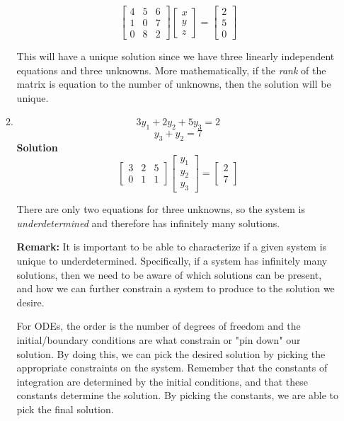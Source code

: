 \documentclass[letterpaper, fontsize=11pt]{scrartcl} %
\numberwithin{equation}{section} %
\numberwithin{figure}{section} %
\numberwithin{table}{section} %
\begin{document}
\begin{enumerate}
\begin{enumerate}
$$\left[ \begin{array}{ccc}
4 & 5 & 6 \\
1 & 0 & 7 \\
0 & 8 & 2 \end{array} \right]
\left[\begin{array}{c}
x  \\
y  \\
z  \end{array} \right] =
\left[\begin{array}{c}
2  \\
5  \\
0  \end{array} \right]$$

\par This will have a unique solution since we have three linearly independent equations and three unknowns. More mathematically, if the \textit{rank} of the matrix is equation to the number of unknowns, then the solution will be unique.

\item
$$ 3 y_1 + 2 y_2 + 5y_3 = 2$$
$$ y_3 + y_2 = 7$$
\textbf{Solution} \newline
$$\left[ \begin{array}{ccc}
3 & 2 & 5 \\
0 & 1 & 1 \end{array} \right]
\left[\begin{array}{c}
y_1  \\
y_2 \\
y_3  \end{array} \right] =
\left[\begin{array}{c}
2  \\
7  \end{array} \right]$$

\par There are only two equations for three unknowns, so the system is \textit{underdetermined} and therefore has infinitely many solutions. \newline

\par \textbf{Remark:} It is important to be able to characterize if a given system is unique to underdetermined. Specifically, if a system has infinitely many solutions, then we need to be aware of which solutions can be present, and how we can further constrain a system to produce to the solution we desire. 
\par For ODEs, the order is the number of degrees of freedom and the initial/boundary conditions are what constrain or "pin down" our solution. By doing this, we can pick the desired solution by picking the appropriate constraints on the system. Remember that the constants of integration are determined by the initial conditions, and that these constants determine the solution. By picking the constants, we are able to pick the final solution. 

\end{enumerate}
\end{enumerate}

\end{document}
